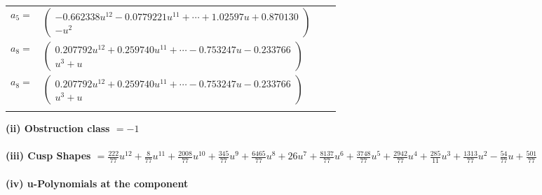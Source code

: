 \documentclass[1p]{elsarticle_modified}
\theoremstyle{definition}
\begin{document}
\begin{tabular}{m{7pt} m{180pt} m{7pt} m{180pt} }
\flushright $a_{5}=$&$\begin{pmatrix}-0.662338 u^{12}-0.0779221 u^{11}+\cdots+1.02597 u+0.870130\\- u^2\end{pmatrix}$ \\
\flushright $a_{8}=$&$\begin{pmatrix}0.207792 u^{12}+0.259740 u^{11}+\cdots-0.753247 u-0.233766\\u^3+u\end{pmatrix}$\\ \flushright $a_{8}=$&$\begin{pmatrix}0.207792 u^{12}+0.259740 u^{11}+\cdots-0.753247 u-0.233766\\u^3+u\end{pmatrix}$\\&\end{tabular}
\flushleft \textbf{(ii) Obstruction class $= -1$}\\~\\
\flushleft \textbf{(iii) Cusp Shapes $= \frac{222}{77} u^{12}+\frac{8}{77} u^{11}+\frac{2008}{77} u^{10}+\frac{345}{77} u^9+\frac{6465}{77} u^8+26 u^7+\frac{8137}{77} u^6+\frac{3748}{77} u^5+\frac{2942}{77} u^4+\frac{285}{11} u^3+\frac{1313}{77} u^2-\frac{54}{77} u+\frac{501}{77}$}\\~\\
\newpage\renewcommand{\arraystretch}{1}
\flushleft \textbf{(iv) u-Polynomials at the component}\newline \\
\end{document}
